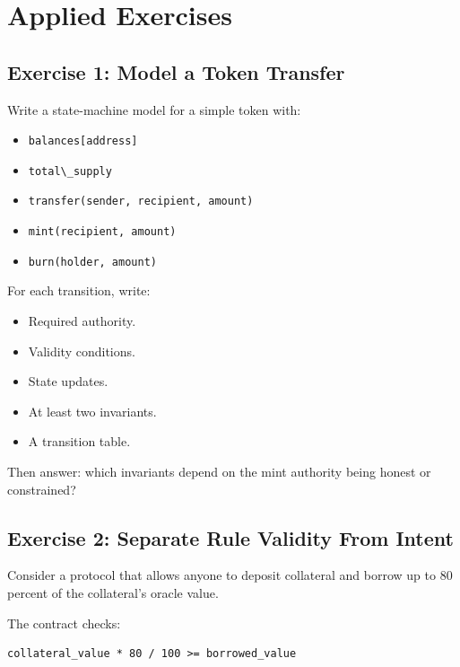 \section{Applied Exercises}

\subsection{Exercise 1: Model a Token Transfer}

Write a state-machine model for a simple token with:

\begin{itemize}
\tightlist
\item
  \passthrough{\lstinline!balances[address]!}
\item
  \passthrough{\lstinline!total\_supply!}
\item
  \passthrough{\lstinline!transfer(sender, recipient, amount)!}
\item
  \passthrough{\lstinline!mint(recipient, amount)!}
\item
  \passthrough{\lstinline!burn(holder, amount)!}
\end{itemize}

For each transition, write:

\begin{itemize}
\tightlist
\item
  Required authority.
\item
  Validity conditions.
\item
  State updates.
\item
  At least two invariants.
\item
  A transition table.
\end{itemize}

Then answer: which invariants depend on the mint authority being honest
or constrained?

\subsection{Exercise 2: Separate Rule Validity From Intent}

Consider a protocol that allows anyone to deposit collateral and borrow
up to 80 percent of the collateral's oracle value.

The contract checks:

\begin{lstlisting}
collateral_value * 80 / 100 >= borrowed_value
\end{lstlisting}

